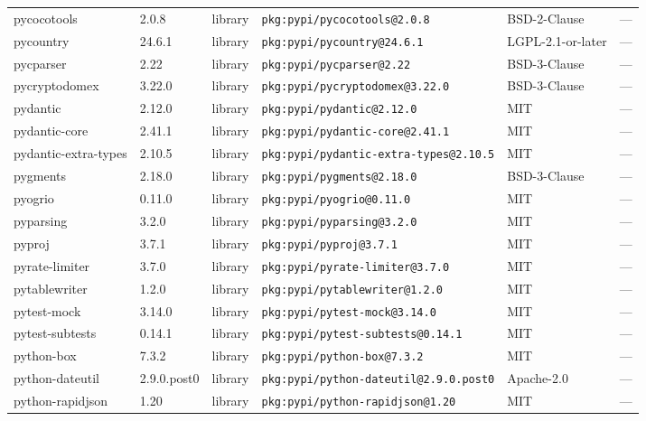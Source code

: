 \documentclass[11pt,a4paper]{article}
\begin{document}
\begin{longtable}{|p{4cm}|p{2cm}|p{1.6cm}|p{5cm}|p{1.5cm}|p{3.5cm}|}
\raggedright pycocotools & 2.0.8 & library & \small\texttt{pkg:pypi/pycocotools@2.0.8} & BSD-2-Clause & \small — \\
\raggedright pycountry & 24.6.1 & library & \small\texttt{pkg:pypi/pycountry@24.6.1} & LGPL-2.1-or-later & \small — \\
\raggedright pycparser & 2.22 & library & \small\texttt{pkg:pypi/pycparser@2.22} & BSD-3-Clause & \small — \\
\raggedright pycryptodomex & 3.22.0 & library & \small\texttt{pkg:pypi/pycryptodomex@3.22.0} & BSD-3-Clause & \small — \\
\raggedright pydantic & 2.12.0 & library & \small\texttt{pkg:pypi/pydantic@2.12.0} & MIT & \small — \\
\raggedright pydantic-core & 2.41.1 & library & \small\texttt{pkg:pypi/pydantic-core@2.41.1} & MIT & \small — \\
\raggedright pydantic-extra-types & 2.10.5 & library & \small\texttt{pkg:pypi/pydantic-extra-types@2.10.5} & MIT & \small — \\
\raggedright pygments & 2.18.0 & library & \small\texttt{pkg:pypi/pygments@2.18.0} & BSD-3-Clause & \small — \\
\raggedright pyogrio & 0.11.0 & library & \small\texttt{pkg:pypi/pyogrio@0.11.0} & MIT & \small — \\
\raggedright pyparsing & 3.2.0 & library & \small\texttt{pkg:pypi/pyparsing@3.2.0} & MIT & \small — \\
\raggedright pyproj & 3.7.1 & library & \small\texttt{pkg:pypi/pyproj@3.7.1} & MIT & \small — \\
\raggedright pyrate-limiter & 3.7.0 & library & \small\texttt{pkg:pypi/pyrate-limiter@3.7.0} & MIT & \small — \\
\raggedright pytablewriter & 1.2.0 & library & \small\texttt{pkg:pypi/pytablewriter@1.2.0} & MIT & \small — \\
\raggedright pytest-mock & 3.14.0 & library & \small\texttt{pkg:pypi/pytest-mock@3.14.0} & MIT & \small — \\
\raggedright pytest-subtests & 0.14.1 & library & \small\texttt{pkg:pypi/pytest-subtests@0.14.1} & MIT & \small — \\
\raggedright python-box & 7.3.2 & library & \small\texttt{pkg:pypi/python-box@7.3.2} & MIT & \small — \\
\raggedright python-dateutil & 2.9.0.post0 & library & \small\texttt{pkg:pypi/python-dateutil@2.9.0.post0} & Apache-2.0 & \small — \\
\raggedright python-rapidjson & 1.20 & library & \small\texttt{pkg:pypi/python-rapidjson@1.20} & MIT & \small — \\

\end{longtable}
\end{document}
